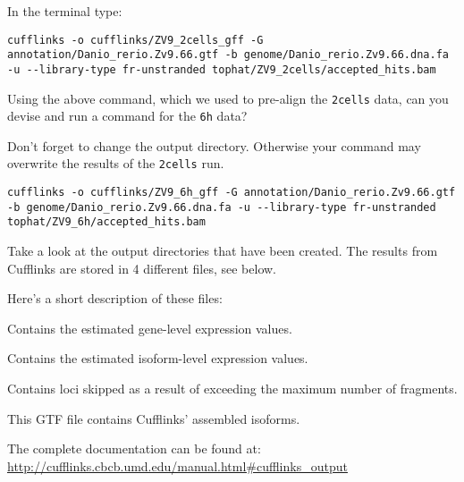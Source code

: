 \begin{steps}
In the terminal type:
\begin{lstlisting}
cufflinks -o cufflinks/ZV9_2cells_gff -G annotation/Danio_rerio.Zv9.66.gtf -b genome/Danio_rerio.Zv9.66.dna.fa -u --library-type fr-unstranded tophat/ZV9_2cells/accepted_hits.bam
\end{lstlisting}
\end{steps}

\begin{questions}
Using the above command, which we used to pre-align the \texttt{2cells} data,
can you devise and run a command for the \texttt{6h} data?
\begin{warning}
Don't forget to change the output directory.
Otherwise your command may overwrite the results of the \texttt{2cells} run.
\end{warning}
\begin{answer}
\begin{lstlisting}
cufflinks -o cufflinks/ZV9_6h_gff -G annotation/Danio_rerio.Zv9.66.gtf -b genome/Danio_rerio.Zv9.66.dna.fa -u --library-type fr-unstranded tophat/ZV9_6h/accepted_hits.bam
\end{lstlisting}
\end{answer}

Take a look at the output directories that have been created. The results from
Cufflinks are stored in 4 different files, see below.
\end{questions}

\begin{information}
Here's a short description of these files:

\begin{description}[style=multiline,labelindent=0cm,align=right,leftmargin=\descriptionlabelspace,rightmargin=1.5cm,font=\ttfamily]
\item[genes.fpkm\_tracking] Contains the estimated gene-level expression values.
\item[isoforms.fpkm\_tracking] Contains the estimated isoform-level expression values.
\item[skipped.gtf] Contains loci skipped as a result of exceeding the maximum number of fragments.
\item[transcripts.gtf] This GTF file contains Cufflinks' assembled isoforms.
\end{description}

The complete documentation can be found at:
\url{http://cufflinks.cbcb.umd.edu/manual.html#cufflinks_output}
\end{information}


